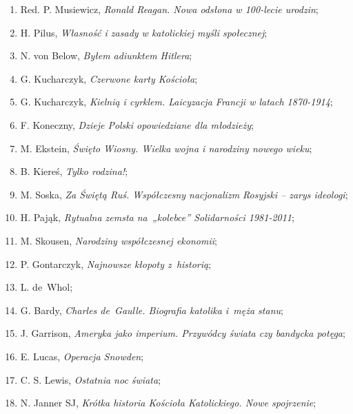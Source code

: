 \documentclass[a4paper,11pt]{article}
\begin{document}
\begin{enumerate}
\item Red. P. Musiewicz, \textit{Ronald Reagan. Nowa odsłona w 100-lecie
    urodzin};

\item H. Pilus, \textit{Własność i zasady w katolickiej myśli
    społecznej};

\item N. von Below, \textit{Byłem adiunktem Hitlera};

\item G. Kucharczyk, \textit{Czerwone karty Kościoła};

\item G. Kucharczyk, \textit{Kielnią i cyrklem. Laicyzacja Francji w
    latach 1870-1914};

\item F. Koneczny, \textit{Dzieje Polski opowiedziane dla młodzieży};

\item M. Ekstein, \textit{Święto Wiosny. Wielka wojna i narodziny nowego
    wieku};

\item B. Kiereś, \textit{Tylko rodzina!};

\item M. Soska, \textit{Za Świętą Ruś. Współczesny nacjonalizm Rosyjski
    -- zarys ideologi};

\item H. Pająk, \textit{Rytualna zemsta na~„kolebce” Solidarności
    1981-2011};

\item M. Skousen, \textit{Narodziny współczesnej ekonomii};

\item P. Gontarczyk, \textit{Najnowsze kłopoty z~historią};

\item L. de~Whol;

\item G. Bardy, \textit{Charles de~Gaulle. Biografia katolika i~męża
    stanu};

\item J. Garrison, \textit{Ameryka jako imperium. Przywódcy świata czy
    bandycka potęga};

\item E. Lucas, \textit{Operacja Snowden};

\item C. S. Lewis, \textit{Ostatnia noc świata};

\item N. Janner SJ, \textit{Krótka historia Kościoła Katolickiego. Nowe
    spojrzenie};


\end{enumerate}
\end{document}
